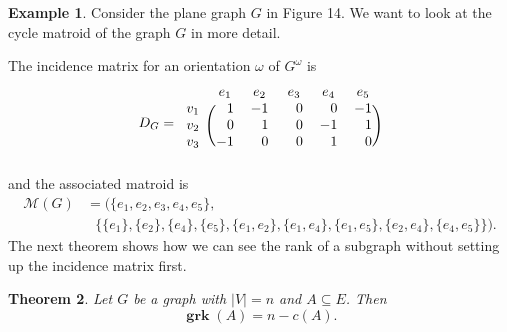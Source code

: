 \documentclass[12pt,a4paper, twoside, autooneside=false]{scrartcl}
\newtheorem{theorem}{Theorem}[section]
\theoremstyle{definition}
\newtheorem{beispiel}[theorem]{Example}
\theoremstyle{remark}
\numberwithin{equation}{section}
\newcommand{\M}{\mathcal{M}} %
\DeclareMathOperator{\grk}{\mathbf{grk}} %
\begin{document}
\begin{beispiel} 
Consider the plane graph $G$ in Figure 14. We want to look at the cycle matroid of the graph $G$ in more detail. 
\begin{center}
        \label{fig:label}
\end{center}
The incidence matrix for an orientation $\omega$ of $G^\omega$ is 
\[D_G = 
\begin{blockarray}{cccccc}
& e_1 & e_2 & e_3 & e_4 & e_5 \\
\begin{block}{c(ccccc)}
v_1 & \phantom{-}1 & -1 & \phantom{-}0 & \phantom{-}0 & -1 \\
v_2 & \phantom{-}0 & \phantom{-}1 & \phantom{-}0 & -1 & \phantom{-}1 \\
v_3 & -1 & \phantom{-}0 & \phantom{-}0 & \phantom{-}1 & \phantom{-}0 \\
\end{block}
\end{blockarray}
\]
and the associated matroid is
\begin{align*}
\M(G) &= \bigg(\bigg\{e_1,e_2, e_3, e_4, e_5\bigg\}, \\ & \ \ \  \bigg\{\{e_1\}, \{e_2\}, \{e_4\}, \{e_5\}, \{e_1, e_2\}, \{e_1, e_4\}, \{e_1, e_5\}, \{e_2, e_4\}, \{e_4, e_5\}\bigg\}\bigg).
\end{align*}
The next theorem shows how we can see the rank of a subgraph without setting up the incidence matrix first.
\end{beispiel}
\begin{theorem}
Let $G$ be a graph with $|V| = n$ and $A \subseteq E$. Then 
\[
\grk(A) = n - c(A).
\]
\end{theorem}
\end{document}
